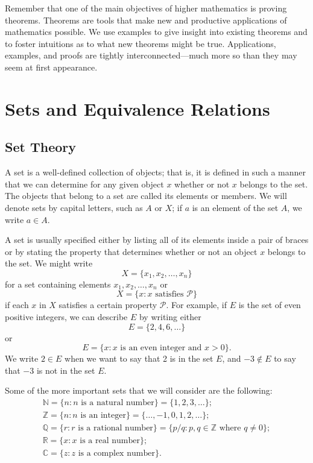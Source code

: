 Remember that one of the main objectives of higher mathematics is proving theorems. Theorems are tools that make new and productive applications of mathematics possible.  We use examples to give insight  into existing theorems and to foster intuitions as to what new theorems might be true.  Applications, examples, and proofs are tightly interconnected---much more so than they may seem at first appearance.
 
 
\section{Sets and Equivalence Relations}\label{sets_sets_and_equivalence}
 
 
\subsection*{Set Theory}
 
A {\bfi set\/} is a well-defined collection of objects; that is, it is defined in such a manner that we can determine for any given object $x$ whether or not $x$ belongs to the set.  The objects that belong to a set are called its {\bfi elements} or {\bfi members}. We will denote sets by capital letters, such as $A$ or $X$; if $a$ is an element of the set $A$, we write $a \in A$\label{sets_membership}.

A set is usually specified either by listing all of its elements inside a pair of braces or by stating the property that determines whether or not an object $x$ belongs to the set. We might write
$$
X = \{ x_1, x_2, \ldots, x_n \}
$$
for a set containing elements $x_1, x_2, \ldots, x_n$ or
$$
X = \{ x :x \mbox{ satisfies ${\mathcal P}$}\}
$$
if each $x$ in $X$ satisfies a certain property ${\mathcal P}$.  For example, if $E$ is the set of even positive integers, we can describe $E$ by writing either 
$$
E = \{2, 4, 6, \ldots \}
$$
or
$$
E = \{ x : x \mbox{ is an even integer and $x > 0$} \}.
$$
We write $2 \in E$ when we want to say that 2 is in the set $E$, and $-3 \notin E$ to say that $-3$ is not in the set $E$.

Some of the more important sets that we will consider are the following: 
\begin{gather*}
{\mathbb N}\label{sets_naturalnum}  = \{n: n \mbox{ is a natural number}\}  = \{1, 2, 3, \ldots \}; \\
{\mathbb Z}\label{sets_integers}  = \{n : n \mbox{ is an integer} \} = \{\ldots, -1, 0, 1,  2, \ldots \} ; \\
{\mathbb Q}\label{sets_rationals} = \{r : r \mbox{ is a rational number}\} = \{p/q : p, q \in {\mathbb Z} \mbox{ where $q \neq 0$}\}; \\
{\mathbb R}\label{sets_reals} = \{ x : x \mbox{ is a real number} \}; \\
{\mathbb C}\label{sets_complexnum} = \{z : z \mbox{ is a complex number}\}.
\end{gather*}

